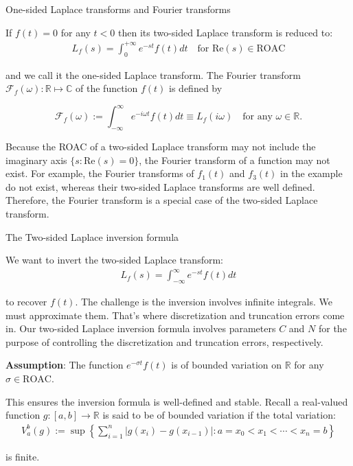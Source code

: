 \documentclass{beamer}
\begin{document}
\begin{frame}{One-sided Laplace transforms and Fourier transforms}


    {\footnotesize \footnotesize
    If \( f(t) = 0 \) for any \( t < 0 \) then its two-sided Laplace transform is reduced to:
    \begin{align*}
        L_f(s) = \int_{0}^{+\infty} e^{-st}f(t)  dt \quad \text{for Re}(s) \in \text{ROAC}
    \end{align*}

    \par and we call it the one-sided Laplace transform. The Fourier transform \emph{\( \mathcal{F}_f(\omega) : \mathbb{R} \mapsto \mathbb{C} \)} of the function \( f(t) \) is defined by

\[
\mathcal{F}_f(\omega) := \int_{-\infty}^{\infty} e^{-i\omega t}f(t)  dt \equiv L_f(i\omega) \quad \text{for any } \omega \in \mathbb{R}.
\]

Because the ROAC of a two-sided Laplace transform may not include the imaginary axis \(\{s : \text{Re}(s) = 0\}\), the Fourier
 transform of a function may not exist. For example, the Fourier transforms of \( f_1(t) \) and \( f_3(t) \) in the example do not exist,
  whereas their 
two-sided Laplace transforms are well defined. Therefore, the Fourier transform is a special case of the two-sided Laplace transform.
    }
    
\end{frame}

\begin{frame}{The Two-sided Laplace inversion formula}


    {\footnotesize \footnotesize
    \par We want to invert the two-sided Laplace transform:
    \begin{align*}
        L_f(s) = \int_{-\infty}^{\infty} e^{-st}f(t)  dt
    \end{align*}
    \par to recover \( f(t) \). The challenge is the inversion involves infinite integrals. We must approximate them. 
    That's where discretization and truncation errors come in. Our two-sided Laplace inversion formula involves 
    parameters \( C \) and \( N \) for the purpose of controlling the discretization and truncation errors, respectively.
    \vspace{1em}
    \par \textbf{Assumption}: The function \( e^{-\sigma t} f(t) \) is of bounded variation on \( \mathbb{R} \) for any \( \sigma \in \text{ROAC} \).
    \par This ensures the inversion formula is well-defined and stable. Recall a real-valued function \( g : [a, b] \to \mathbb{R} \) is said to be of bounded variation if the total variation:
    \begin{align*}
        V_a^b(g) := \sup \left\{ \sum_{i=1}^n |g(x_i) - g(x_{i-1})| : a = x_0 < x_1 < \cdots < x_n = b \right\}
    \end{align*}
    \par is finite.
    }
    
\end{frame}
\end{document}

